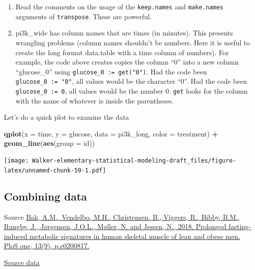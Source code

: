 \documentclass[]{book}
\newenvironment{Shaded}{\begin{snugshade}}{\end{snugshade}}
\newcommand{\DataTypeTok}[1]{\textcolor[rgb]{0.13,0.29,0.53}{#1}}
\newcommand{\KeywordTok}[1]{\textcolor[rgb]{0.13,0.29,0.53}{\textbf{#1}}}
\newcommand{\NormalTok}[1]{#1}
\newcommand{\OperatorTok}[1]{\textcolor[rgb]{0.81,0.36,0.00}{\textbf{#1}}}
\newcommand{\StringTok}[1]{\textcolor[rgb]{0.31,0.60,0.02}{#1}}
\providecommand{\tightlist}{%
  \setlength{\itemsep}{0pt}\setlength{\parskip}{0pt}}
\begin{document}
\begin{enumerate}
\def\labelenumi{\arabic{enumi}.}
\tightlist
\item
  Read the comments on the usage of the \texttt{keep.names} and \texttt{make.names} arguments of \texttt{transpose}. These are powerful.
\item
  pi3k\_wide has column names that are times (in minutes). This presents wrangling problems (column names shouldn't be numbers. Here it is useful to create the long format data.table with a time column of numbers). For example, the code above creates copies the column ``0'' into a new column ``glucose\_0'' using \texttt{glucose\_0\ :=\ get("0")}. Had the code been \texttt{glucose\_0\ :=\ "0"}, all values would be the character ``0''. Had the code been \texttt{glucose\_0\ :=\ 0}, all values would be the number 0. \texttt{get} looks for the column with the name of whatever is inside the parentheses.
\end{enumerate}

Let's do a quick plot to examine the data

\begin{Shaded}
\begin{Highlighting}[]
\KeywordTok{qplot}\NormalTok{(}\DataTypeTok{x =}\NormalTok{ time,}
      \DataTypeTok{y =}\NormalTok{ glucose,}
      \DataTypeTok{data =}\NormalTok{ pi3k_long,}
      \DataTypeTok{color =}\NormalTok{ treatment) }\OperatorTok{+}
\StringTok{  }\KeywordTok{geom_line}\NormalTok{(}\KeywordTok{aes}\NormalTok{(}\DataTypeTok{group =}\NormalTok{ id))}
\end{Highlighting}
\end{Shaded}

\texttt{[image: Walker-elementary-statistical-modeling-draft\_files/figure-latex/unnamed-chunk-59-1.pdf]}

\hypertarget{combining-data}{%
\subsection{Combining data}\label{combining-data}}

Source \href{https://journals.plos.org/plosone/article?id=10.1371/journal.pone.0200817}{Bak, A.M., Vendelbo, M.H., Christensen, B., Viggers, R., Bibby, B.M., Rungby, J., Jørgensen, J.O.L., Møller, N. and Jessen, N., 2018. Prolonged fasting-induced metabolic signatures in human skeletal muscle of lean and obese men. PloS one, 13(9), p.e0200817.}

\href{https://datadryad.org/stash/dataset/doi:10.5061/dryad.6121hj7}{Source data}
\end{document}
